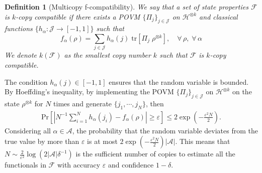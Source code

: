 \documentclass[aps,%
twocolumn,%
floatfix,%
pra,%
amsfonts,%
groupedaddress,%
superscriptaddress]{revtex4-2}%
\newtheorem{definition}{Definition}[section]
\newcommand{\1}{\mathbbm{1}}
\begin{document}
\begin{definition}[Multicopy f-compatibility]\label{def:f-compatibility}
 We say that a set of state properties $\mathcal{F}$ is $k$-copy compatible if there exists a POVM $\{\Pi_j\}_{j \in \mathcal{J}}$ on $\mathcal{H}^{\otimes k}$ and classical functions $\{h_\alpha: \mathcal{J} \to [-1,1]\}$ such that
$$
f_\alpha(\rho) = \sum_{j \in \mathcal{J}} h_\alpha(j)\;\mathrm{tr}[\Pi_j\;\rho^{\otimes k}], \quad \forall\,\rho,\;\forall\,\alpha
$$
We denote $k(\mathcal{F})$ as the smallest copy number $k$ such that $\mathcal{F}$ is $k$-copy compatible.
\end{definition}

The condition $h_\alpha(j) \in [-1,1]$ ensures that the random variable is bounded. 
By Hoeffding's inequality, by implementing the POVM $\{\Pi_j\}_{j \in \mathcal{J}}$ on $\mathcal{H}^{\otimes k}$ on the state $\rho^{\otimes k}$ for $N$ times and generate $\{j_1,\cdots,j_N\}$, then
\begin{align}
\mathrm{Pr}\left[\left|N^{-1}\sum_{i=1}^N h_\alpha(j_i) - f_{\alpha}(\rho)\right| \geq \varepsilon\right] \leq 2\exp\left(-\frac{\varepsilon^2 N}{2}\right).
\end{align}
Considering all $\alpha \in \mathcal{A}$, the probability that the random variable deviates from the true value by more than $\varepsilon$ is at most $2\exp\left(-\frac{\varepsilon^2 N}{2}\right)|\mathcal{A}|$. This means that $N \sim \frac{2}{\varepsilon^2} \log(2|\mathcal{A}|\delta^{-1})$ is the sufficient number of copies to estimate all the functionals in $\mathcal{F}$ with accuracy $\varepsilon$ and confidence $1-\delta$.

\color{red}
\end{document}
